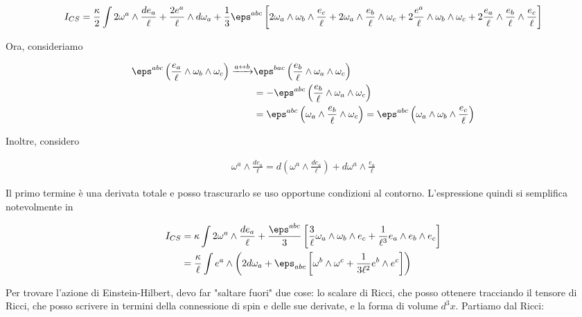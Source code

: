 \documentclass{report}
\begin{document}
\begin{align}
    I_{CS} = \frac{\kappa}{2}\int 2\omega^a \wedge \frac{de_a}{\ell} + \frac{2e^a}{\ell}\wedge d\omega_a + \frac{1}{3}\eps^{abc}\left[2\omega_a \wedge \omega_b \wedge \frac{e_c}{\ell} + 2\omega_a \wedge \frac{e_b}{\ell} \wedge \omega_c + 2\frac{e^a}{\ell} \wedge \omega_b \wedge \omega_c + 2\frac{e_a}{\ell} \wedge \frac{e_b}{\ell} \wedge \frac{e_c}{\ell}\right]
\end{align}

Ora, consideriamo 

\begin{align}
    \eps^{abc}\left(\frac{e_a}{\ell} \wedge \omega_b \wedge \omega_c \right) \xrightarrow{a \leftrightarrow b}  &\eps^{bac}\left(\frac{e_b}{\ell} \wedge \omega_a \wedge \omega_c \right) \\
    &= -\eps^{abc}\left(\frac{e_b}{\ell} \wedge \omega_a \wedge \omega_c \right) \\
    &= \eps^{abc}\left(\omega_a \wedge \frac{e_b}{\ell}  \wedge \omega_c \right) = \eps^{abc}\left(\omega_a \wedge \omega_b  \wedge \frac{e_c}{\ell} \right)
\end{align}

Inoltre, considero 

\begin{align}
    \omega^a \wedge \frac{de_a}{\ell} = d\left(\omega^a \wedge \frac{de_a}{\ell} \right) + d\omega^a \wedge \frac{e_a}{\ell}
\end{align}

Il primo termine è una derivata totale e posso trascurarlo se uso opportune condizioni al contorno. L'espressione quindi si semplifica notevolmente in 

\begin{align}
    I_{CS} &= \kappa\int 2\omega^a \wedge \frac{de_a}{\ell} + \frac{\eps^{abc}}{3}\left[\frac{3}{\ell}\omega_a \wedge \omega_b \wedge e_c + \frac{1}{\ell^3}e_a \wedge e_b \wedge e_c \right] \\ 
    &= \frac{\kappa}{\ell} \int e^a \wedge \left(2d\omega_a + \eps_{abc}\left[\omega^b \wedge \omega^c + \frac{1}{3\ell^2} e^b \wedge e^c \right] \right)
\end{align}

Per trovare l'azione di Einstein-Hilbert, devo far "saltare fuori" due cose: lo scalare di Ricci, che posso ottenere tracciando il tensore di Ricci, che posso scrivere in termini della connessione di spin e delle sue derivate, e la forma di volume \(d^3x\). Partiamo dal Ricci: 
\end{document}
